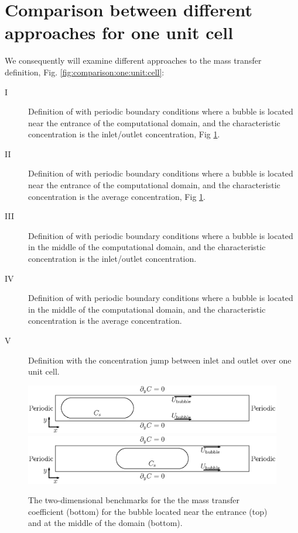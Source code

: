 \documentclass{article}
\begin{document}
\section{Comparison between different approaches for one unit cell}
We consequently will examine different approaches to the mass transfer definition, Fig.
\ref{fig:comparison:one:unit:cell}:
\begin{description}
\item[I] Definition of \citet{vanbaten-circular} with periodic boundary conditions where a bubble
is located near the entrance of the computational domain, and the characteristic concentration is
the inlet/outlet concentration, Fig \ref{fig:benchmark}. 
\item[II] Definition of \citet{vanbaten-circular} with periodic boundary conditions where a bubble
is located near the entrance of the computational domain, and the characteristic concentration is
the average concentration, Fig \ref{fig:benchmark}.
\item[III] Definition of \citet{vanbaten-circular} with periodic boundary conditions where a
bubble is located in the middle of the computational domain, and the characteristic concentration
is the inlet/outlet concentration.
\item[IV] Definition of \citet{vanbaten-circular} with periodic boundary conditions where a bubble
is located in the middle of the computational domain, and the characteristic concentration is the
average concentration.
\item[V] Definition with the concentration jump between inlet and outlet over one unit cell.
\end{description}
\begin{figure}[htb!]
\includegraphics[width=\textwidth]{Figures/benchmark_periodic.eps}\\
\includegraphics[width=\textwidth]{Figures/benchmark_middle.eps}\\
\caption{The two-dimensional benchmarks for the  the mass transfer
coefficient (bottom) for the bubble located near the entrance (top) and at the middle of the domain
(bottom). \label{fig:benchmark}}
\end{figure}
\end{document}
